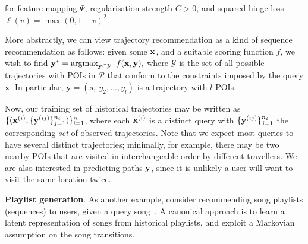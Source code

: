 for
feature mapping $\Psi$,
regularisation strength $C > 0$,
and squared hinge loss $\ell( v ) = \max( 0, 1 - v )^2$.

More abstractly, we can view trajectory recommendation as a kind of sequence recommendation as follows:
given some $\mathbf{x}$, and a suitable scoring function $f$, we wish to find
$\mathbf{y}^* = \operatorname*{argmax}_{\mathbf{y} \in \mathcal{Y}}~f(\mathbf{x}, \mathbf{y}),$ 
where $\mathcal{Y}$ is the set of all possible trajectories with POIs in $\mathcal{P}$ that conform to the constraints imposed by the query $\mathbf{x}$.
In particular,
$\mathbf{y} = (s,~ y_2, \dots, y_l)$ is a trajectory with $l$ POIs. %

Now, our training set of historical trajectories may be written as
$\{ ( \mathbf{x}^{({i})}, \{ \mathbf{y}^{({ij})} \}_{j=1}^{n_i} ) \}_{i=1}^{n}$,
where each $\mathbf{x}^{({i})}$ is a distinct query
with $\{ \mathbf{y}^{({ij})} \}_{j=1}^{n_i}$ the corresponding \emph{set} of observed trajectories.
Note that we expect most queries to have several distinct trajectories;
minimally,
for example,
there may be two nearby POIs that are visited in interchangeable order by different travellers.
We are also interested in predicting paths $\mathbf{y}$, since it is unlikely a user will want to visit the same location twice.


%
\textbf{Playlist generation}.
As another example, consider recommending song playlists (\ie sequences) to users, given a query song~\citep{McFee:2011,chen2012playlist,hidasi2015session,choi2016towards}.
A canonical approach is to
learn a latent representation of songs from historical playlists,
and exploit a Markovian assumption on the song transitions.



